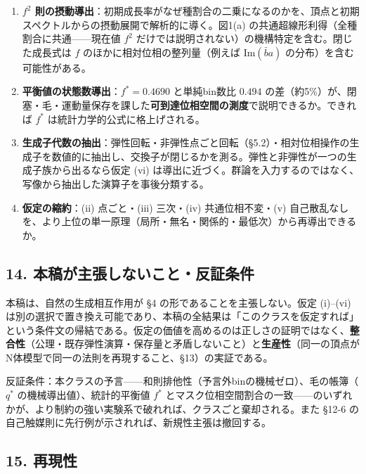 \documentclass[
  a4paper,
]{ltjsarticle}
\providecommand{\tightlist}{%
  \setlength{\itemsep}{0pt}\setlength{\parskip}{0pt}}
\begin{document}
\begin{enumerate}
\def\labelenumi{\arabic{enumi}.}
\tightlist
\item
  \textbf{\(f^2\)
  則の摂動導出}：初期成長率がなぜ種割合の二乗になるのかを、頂点と初期スペクトルからの摂動展開で解析的に導く。図1(a)
  の共通超線形利得（全種割合に共通------現在値 \(f^2\)
  だけでは説明されない）の機構特定を含む。閉じた成長式は \(f\)
  のほかに相対位相の整列量（例えば \(\mathrm{Im}(\bar b a)\)
  の分布）を含む可能性がある。
\item
  \textbf{平衡値の状態数導出}：\(f^*=0.4690\) と単純bin数比 \(0.494\)
  の差（約5\%）が、閉塞・毛・運動量保存を課した\textbf{可到達位相空間の測度}で説明できるか。できれば
  \(f^*\) は統計力学的公式に格上げされる。
\item
  \textbf{生成子代数の抽出}：弾性回転・非弾性点ごと回転（§5.2）・相対位相操作の生成子を数値的に抽出し、交換子が閉じるかを測る。弾性と非弾性が一つの生成子族から出るなら仮定
  (vi)
  は導出に近づく。群論を入力するのではなく、写像から抽出した演算子を事後分類する。
\item
  \textbf{仮定の縮約}：(ii) 点ごと・(iii) 三次・(iv) 共通位相不変・(v)
  自己散乱なしを、より上位の単一原理（局所・無名・関係的・最低次）から再導出できるか。
\end{enumerate}

\subsection{14.
本稿が主張しないこと・反証条件}\label{ux672cux7a3fux304cux4e3bux5f35ux3057ux306aux3044ux3053ux3068ux53cdux8a3cux6761ux4ef6}

本稿は、自然の生成相互作用が §4 の形であることを主張しない。仮定
(i)--(vi)
は別の選択で置き換え可能であり、本稿の全結果は「このクラスを仮定すれば」という条件文の帰結である。仮定の価値を高めるのは正しさの証明ではなく、\textbf{整合性}（公理・既存弾性演算・保存量と矛盾しないこと）と\textbf{生産性}（同一の頂点がN体模型で同一の法則を再現すること、§13）の実証である。

反証条件：本クラスの予言------和則排他性（予言外binの機械ゼロ）、毛の帳簿（\(q^*\)
の機械導出値）、統計的平衡値 \(f^*\)
とマスク位相空間割合の一致------のいずれかが、より制約の強い実験系で破れれば、クラスごと棄却される。また
§12-6 の自己触媒則に先行例が示されれば、新規性主張は撤回する。

\subsection{15. 再現性}\label{ux518dux73feux6027}
\end{document}
